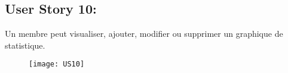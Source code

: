 \newpage
\subsection{User Story 10:}
Un membre peut  visualiser, ajouter, modifier ou supprimer un graphique de statistique.


\begin{figure}[!h]
  \begin{center}
        \texttt{[image: US10]}
        \label{US10-dia}
  \end{center}
\end{figure}
